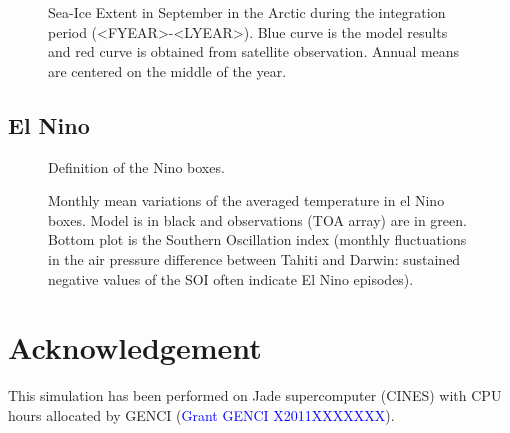 \documentclass[12pt]{article}
\begin{document}
\begin{figure}[H]
\begin{center}
\caption{Sea-Ice Extent in September in the Arctic during the integration period (<FYEAR>-<LYEAR>). Blue curve is the model results and red curve is obtained from satellite observation. Annual means are centered on the middle of the year.}
\end{center}
\end{figure}

\subsection{El Nino}

\begin{figure}[H]
\begin{center}
\caption{Definition of the Nino boxes.}
\end{center}
\end{figure}

\begin{figure}[H]
\begin{center}
\caption{Monthly mean variations of the averaged temperature in el Nino boxes. Model is in black and observations (TOA array) are in green. Bottom plot is the Southern Oscillation index (monthly fluctuations in the air pressure difference between Tahiti and Darwin: sustained negative values of the SOI often indicate El Nino episodes).}
\end{center}
\end{figure}

\section*{Acknowledgement}

This simulation has been performed on Jade supercomputer (CINES) with CPU hours allocated by GENCI (\textcolor{blue}{Grant GENCI X2011XXXXXXX}).



\end{document}
